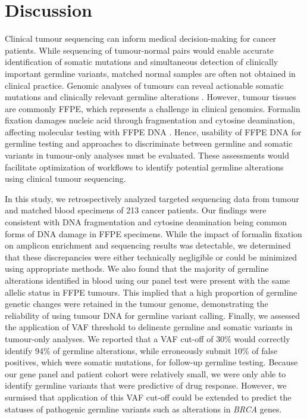 
\chapter{Discussion}
\label{ch:Discussion}

Clinical tumour sequencing can inform medical decision-making for cancer patients. While sequencing of tumour-normal pairs would enable accurate identification of somatic mutations and simultaneous detection of clinically important germline variants, matched normal samples are often not obtained in clinical practice. Genomic analyses of tumours can reveal actionable somatic mutations and clinically relevant germline alterations \cite{Meric-Bernstam2016, Schrader2015, Jones2015a}. However, tumour tissues are commonly FFPE, which represents a challenge in clinical genomics. Formalin fixation damages nucleic acid through fragmentation and cytosine deamination, affecting molecular testing with FFPE DNA \cite{Do2015a, Kim2017, Ofner2017, Oh2015, Wong2013, Wong2014, Sikorsky2007}. Hence, usability of FFPE DNA for germline testing and approaches to discriminate between germline and somatic variants in tumour-only analyses must be evaluated. These assessments would facilitate optimization of workflows to identify potential germline alterations using clinical tumour sequencing.

In this study, we retrospectively analyzed targeted sequencing data from tumour and matched blood specimens of 213 cancer patients. Our findings were consistent with DNA fragmentation and cytosine deamination being common forms of DNA damage in FFPE specimens. While the impact of formalin fixation on amplicon enrichment and sequencing results was detectable, we determined that these discrepancies were either technically negligible or could be minimized using appropriate methods. We also found that the majority of germline alterations identified in blood using our panel test were present with the same allelic status in FFPE tumours. This implied that a high proportion of germline genetic changes were retained in the tumour genome, demonstrating the reliability of using tumour DNA for germline variant calling. Finally, we assessed the application of VAF threshold to delineate germline and somatic variants in tumour-only analyses. We reported that a VAF cut-off of 30\% would correctly identify 94\% of germline alterations, while erroneously submit 10\% of false positives, which were somatic mutations, for follow-up germline testing. Because our gene panel and patient cohort were relatively small, we were only able to identify germline variants that were predictive of drug response. However, we surmised that application of this VAF cut-off could be extended to predict the statuses of pathogenic germline variants such as alterations in \textit{BRCA} genes.

